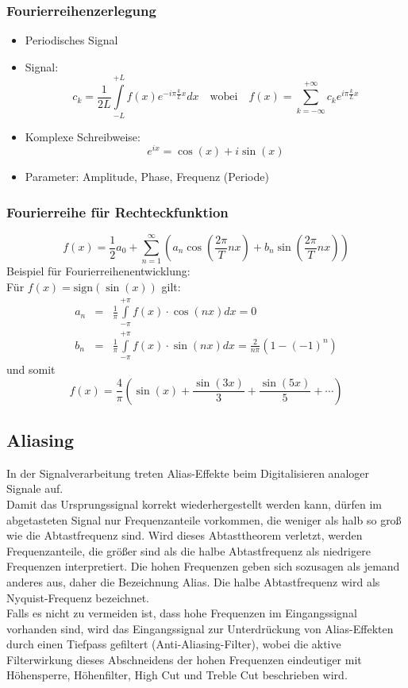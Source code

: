 \subsubsection*{Fourierreihenzerlegung}
\begin{itemize}
\item Periodisches Signal
\item Signal: $$c_k = \frac{1}{2L} \int\limits_{-L}^{+L} f(x) e^{-i \pi \frac{k}{L} x} dx \quad \textrm{wobei} \quad f(x) = \sum\limits_{k=- \infty}^{+ \infty} c_k e^{i \pi \frac{k}{L} x}$$
\item Komplexe Schreibweise: $$e^{ix} = \cos(x) + i \sin(x)$$
\item Parameter: Amplitude, Phase, Frequenz (Periode)
\end{itemize}

\subsubsection*{Fourierreihe für Rechteckfunktion}
$$f(x) = \frac{1}{2} a_0 + \sum\limits_{n=1}^{\infty} \left( a_n \cos( \frac{2 \pi}{T} nx) + b_n \sin (\frac{2 \pi}{T} nx) \right)$$
Beispiel für Fourierreihenentwicklung: \\
Für $f(x) = \textrm{sign}(\sin(x))$ gilt:
\begin{eqnarray*}
a_n &=& \frac{1}{\pi} \int\limits_{- \pi}^{+ \pi} f(x) \cdot \cos(nx) dx = 0 \\
b_n &=& \frac{1}{\pi} \int\limits_{- \pi}^{+ \pi} f(x) \cdot \sin(nx) dx = \frac{2}{n \pi} (1 - (-1)^n)
\end{eqnarray*}
und somit $$f(x) = \frac{4}{\pi} \left( \sin(x) + \frac{\sin(3x)}{3} + \frac{\sin(5x)}{5} + \cdots \right)$$

\subsection{Aliasing}
In der Signalverarbeitung treten Alias-Effekte beim Digitalisieren analoger Signale auf. \\
Damit das Ursprungssignal korrekt wiederhergestellt werden kann, dürfen im abgetasteten Signal nur Frequenzanteile vorkommen, die weniger als halb so groß wie die Abtastfrequenz sind. Wird dieses Abtasttheorem verletzt, werden Frequenzanteile, die größer sind als die halbe Abtastfrequenz als niedrigere Frequenzen interpretiert. Die hohen Frequenzen geben sich sozusagen als jemand anderes aus, daher die Bezeichnung Alias. Die halbe Abtastfrequenz wird als Nyquist-Frequenz bezeichnet. \\
Falls es nicht zu vermeiden ist, dass hohe Frequenzen im Eingangssignal vorhanden sind, wird das Eingangssignal zur Unterdrückung von Alias-Effekten durch einen Tiefpass gefiltert (Anti-Aliasing-Filter), wobei die aktive Filterwirkung dieses Abschneidens der hohen Frequenzen eindeutiger mit Höhensperre, Höhenfilter, High Cut und Treble Cut beschrieben wird.

